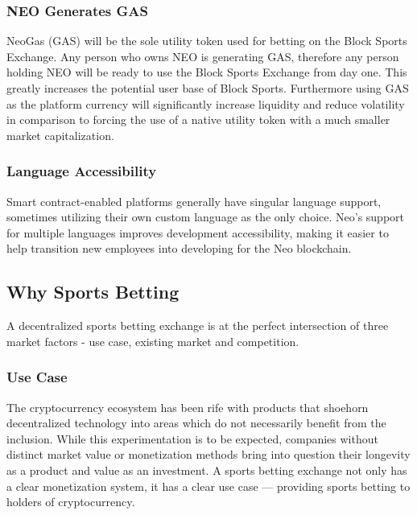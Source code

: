 \documentclass{article}
\begin{document}
		\subsubsection{NEO Generates GAS} \label{neo-generates-gas}
NeoGas (GAS) will be the sole utility token used for betting on the Block Sports Exchange. Any person who owns NEO is generating GAS, therefore any person holding NEO will be ready to use the Block Sports Exchange from day one. This greatly increases the potential user base of Block Sports. Furthermore using GAS as the platform currency will significantly increase liquidity and reduce volatility in comparison to forcing the use of a native utility token with a much smaller market capitalization.

		\subsubsection{Language Accessibility} \label{language-accessibility}
Smart contract-enabled platforms generally have singular language support, sometimes utilizing their own custom language as the only choice. Neo’s support for multiple languages improves development accessibility, making it easier to help transition new employees into developing for the Neo blockchain.

	\subsection{Why Sports Betting} \label{why-sports-betting}
A decentralized sports betting exchange is at the perfect intersection of three market factors - use case, existing market and competition.

		\subsubsection{Use Case} \label{use-case}
The cryptocurrency ecosystem has been rife with products that shoehorn decentralized technology into areas which do not necessarily benefit from the inclusion. While this experimentation is to be expected, companies without distinct market value or monetization methods bring into question their longevity as a product and value as an investment. A sports betting exchange not only has a clear monetization system, it has a clear use case --- providing sports betting to holders of cryptocurrency.
\end{document}
